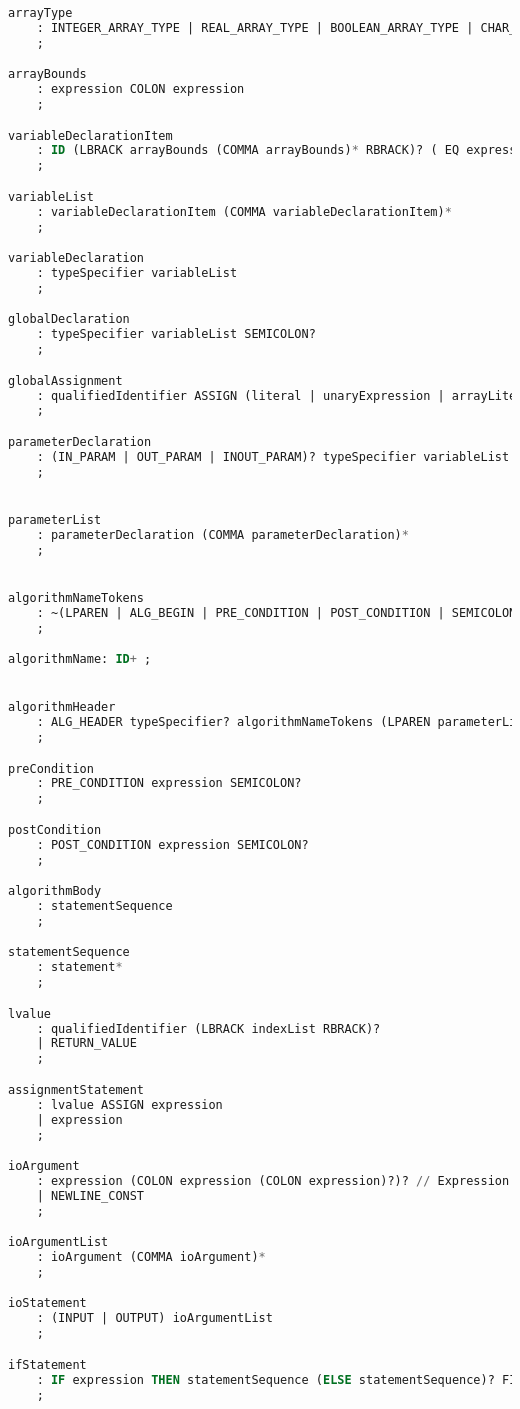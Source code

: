 \begin{lstlisting}[language=sql, caption={Парсер грамматики в формате ANTRL}, label=lst:kafka-click2]
arrayType 
    : INTEGER_ARRAY_TYPE | REAL_ARRAY_TYPE | BOOLEAN_ARRAY_TYPE | CHAR_ARRAY_TYPE | STRING_ARRAY_TYPE
    ;

arrayBounds 
    : expression COLON expression
    ;

variableDeclarationItem
    : ID (LBRACK arrayBounds (COMMA arrayBounds)* RBRACK)? ( EQ expression )?
    ;

variableList
    : variableDeclarationItem (COMMA variableDeclarationItem)*
    ;

variableDeclaration
    : typeSpecifier variableList
    ;

globalDeclaration
    : typeSpecifier variableList SEMICOLON?
    ;

globalAssignment
    : qualifiedIdentifier ASSIGN (literal | unaryExpression | arrayLiteral) SEMICOLON?
    ;

parameterDeclaration
    : (IN_PARAM | OUT_PARAM | INOUT_PARAM)? typeSpecifier variableList
    ;


parameterList
    : parameterDeclaration (COMMA parameterDeclaration)*
    ;


algorithmNameTokens
    : ~(LPAREN | ALG_BEGIN | PRE_CONDITION | POST_CONDITION | SEMICOLON | EOF)+
    ;

algorithmName: ID+ ;


algorithmHeader
    : ALG_HEADER typeSpecifier? algorithmNameTokens (LPAREN parameterList? RPAREN)? SEMICOLON?
    ;

preCondition
    : PRE_CONDITION expression SEMICOLON?
    ;

postCondition
    : POST_CONDITION expression SEMICOLON?
    ;

algorithmBody
    : statementSequence
    ;

statementSequence
    : statement*
    ;

lvalue
    : qualifiedIdentifier (LBRACK indexList RBRACK)? 
    | RETURN_VALUE                                  
    ;

assignmentStatement
    : lvalue ASSIGN expression
    | expression
    ;

ioArgument
    : expression (COLON expression (COLON expression)?)? // Expression with optional formatting
    | NEWLINE_CONST 
    ;

ioArgumentList
    : ioArgument (COMMA ioArgument)*
    ;

ioStatement
    : (INPUT | OUTPUT) ioArgumentList
    ;

ifStatement
    : IF expression THEN statementSequence (ELSE statementSequence)? FI
    ;


\end{lstlisting}
